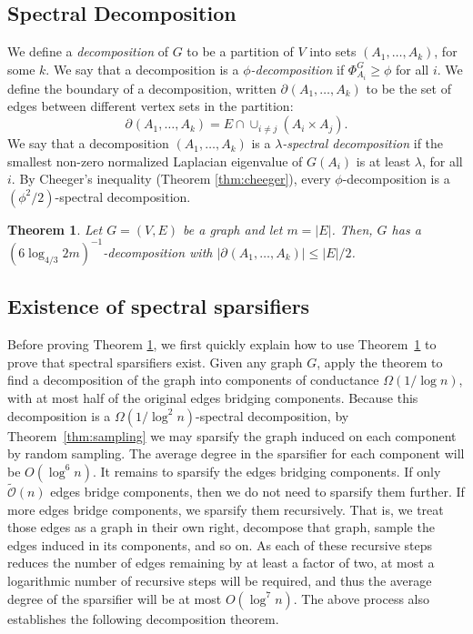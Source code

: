 \documentclass[11pt]{article}
\newtheorem{theorem}{Theorem}[section]
\def\softO#1{\widetilde{\mathcal{O}} \left( #1 \right)}
\def\bdry#1#2{\partial_{#1}\left(#2\right)}
\def\union{\cup}
\def\intersect{\cap}
\def\sizeof#1{\left|#1  \right|}
\def\intersect{\cap}
\def\Conducin#1{\Phi^{G}_{#1}}
\begin{document}
\subsection{Spectral Decomposition}

We define a \emph{decomposition} of $G$ to be a partition of $V$ into sets
  $(A_{1}, \dotsc , A_{k})$, for some $k$.
We say that a decomposition is 
  a \emph{$\phi$-decomposition} if
  $\Conducin{A_{i}}{} \geq \phi$ for all $i$.
We define the boundary of a decomposition, written
  $\bdry{}{A_{1},\dotsc , A_{k}}$ to be the set of edges between different
  vertex sets in the partition:
\[
  \bdry{}{A_{1},\dotsc , A_{k}} = 
     E \intersect  \union_{i \not = j} (A_{i} \times A_{j}).
\]
We say that a decomposition $(A_{1}, \dotsc , A_{k})$ is a
  \emph{$\lambda$-spectral decomposition}
  if the smallest non-zero normalized Laplacian eigenvalue of
  $G (A_i)$ is at least $\lambda$, for all $i$.
By Cheeger's inequality (Theorem \ref{thm:cheeger}),
  every $\phi$-decomposition is a $(\phi^2/2)$-spectral decomposition.

\begin{theorem}\label{thm:graphDecompExist}
Let $G = (V,E)$ be a graph and let $m = \sizeof{E}$.
Then, $G$ has a $\left(6 \log_{4/3} 2 m \right)^{-1}$-decomposition with
$\sizeof{\bdry{}{A_{1}, \dotsc , A_{k}}} \leq \sizeof{E}/2$.
\end{theorem}


\subsection{Existence of spectral sparsifiers}\label{sec:existence}
Before proving Theorem \ref{thm:graphDecompExist},
  we first quickly explain how to use Theorem~\ref{thm:graphDecompExist}
  to prove that spectral sparsifiers exist.
Given any graph $G$, apply the theorem to find a decomposition of the graph
  into components of conductance $\Omega (1/\log n)$, with at most half of the
  original edges bridging components.
Because this decomposition is a $\Omega(1/\log^2 n)$-spectral decomposition,
by Theorem~\ref{thm:sampling} we may sparsify the graph induced on
  each component by random sampling.
The average degree in the sparsifier for each component will be
  $O(\log^{6} n)$.
It remains to sparsify the edges bridging components.
If only $\softO{n}$ edges bridge components, then we do not need to sparsify
  them further.
If more edges bridge components, we sparsify them recursively.
That is, we treat those edges as a graph in their own right,
  decompose that graph, sample the edges induced in its components,
  and so on.
As each of these recursive steps reduces the number of edges remaining
  by at least a factor of two,
  at most a logarithmic number of recursive steps will be required, and thus the
  average degree of the sparsifier will be at most $O (\log^{7} n)$.
The above process also establishes the following decomposition theorem.
\end{document}
